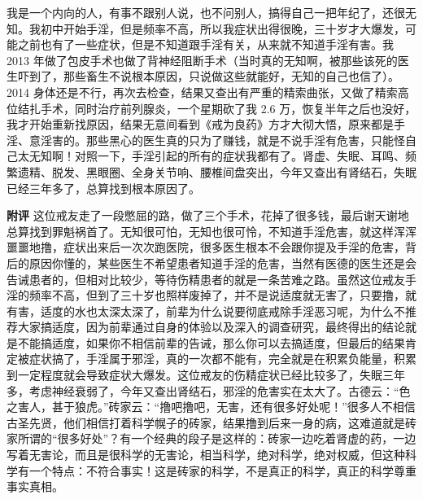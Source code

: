 \begin{case}
    我是一个内向的人，有事不跟别人说，也不问别人，搞得自己一把年纪了，还很无知。我初中开始手淫，但是频率不高，所以我症状出得很晚，三十岁才大爆发，可能之前也有了一些症状，但是不知道跟手淫有关，从来就不知道手淫有害。我 2013 年做了包皮手术也做了背神经阻断手术（当时真的无知啊，被那些该死的医生吓到了，那些畜生不说根本原因，只说做这些就能好，无知的自己也信了）。2014 身体还是不行，再次去检查，结果又查出有严重的精索曲张，又做了精索高位结扎手术，同时治疗前列腺炎，一个星期砍了我 2.6 万，恢复半年之后也没好，我才开始重新找原因，结果无意间看到《戒为良药》方才大彻大悟，原来都是手淫、意淫害的。那些黑心的医生真的只为了赚钱，就是不说手淫有危害，只能怪自己太无知啊！对照一下，手淫引起的所有的症状我都有了。肾虚、失眠、耳鸣、频繁遗精、脱发、黑眼圈、全身关节响、腰椎间盘突出，今年又查出有肾结石，失眠已经三年多了，总算找到根本原因了。

    \textbf{附评} 这位戒友走了一段憋屈的路，做了三个手术，花掉了很多钱，最后谢天谢地总算找到罪魁祸首了。无知很可怕，无知也很可怜，不知道手淫危害，就这样浑浑噩噩地撸，症状出来后一次次跑医院，很多医生根本不会跟你提及手淫的危害，背后的原因你懂的，某些医生不希望患者知道手淫的危害，当然有医德的医生还是会告诫患者的，但相对比较少，等待伤精患者的就是一条苦难之路。虽然这位戒友手淫的频率不高，但到了三十岁也照样废掉了，并不是说适度就无害了，只要撸，就有害，适度的水也太深太深了，前辈为什么说要彻底戒除手淫恶习呢，为什么不推荐大家搞适度，因为前辈通过自身的体验以及深入的调查研究，最终得出的结论就是不能搞适度，如果你不相信前辈的告诫，那么你可以去搞适度，但最后的结果肯定被症状搞了，手淫属于邪淫，真的一次都不能有，完全就是在积累负能量，积累到一定程度就会导致症状大爆发。这位戒友的伤精症状已经比较多了，失眠三年多，考虑神经衰弱了，今年又查出肾结石，邪淫的危害实在太大了。古德云：“色之害人，甚于狼虎。”砖家云：“撸吧撸吧，无害，还有很多好处呢！”很多人不相信古圣先贤，他们相信打着科学幌子的砖家，结果撸到后来一身的病，这难道就是砖家所谓的“很多好处”？有一个经典的段子是这样的：砖家一边吃着肾虚的药，一边写着无害论，而且是很科学的无害论，相当科学，绝对科学，绝对权威，但这种科学有一个特点：不符合事实！这是砖家的科学，不是真正的科学，真正的科学尊重事实真相。
\end{case}

